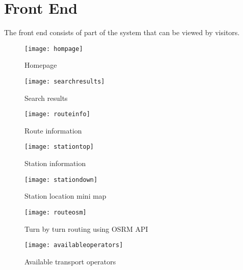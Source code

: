 \section{Front End}
The front end consists of part of the system that can be viewed by visitors.
\begin{figure}[H]
	\centering
	\texttt{[image: hompage]}
	\caption[Homepage]{Homepage}
	\label{fig:hompage}
\end{figure}
\begin{figure}[H]
	\centering
	\texttt{[image: searchresults]}
	\caption[Search Results]{Search results}
	\label{fig:searchresults}
\end{figure}
\begin{figure}[H]
	\centering
	\texttt{[image: routeinfo]}
	\caption[Route Information]{Route information}
	\label{fig:routeinfo}
\end{figure}
\begin{figure}[H]
	\centering
	\texttt{[image: stationtop]}
	\caption[Station information]{Station information}
	\label{fig:stationtop}
\end{figure}
\begin{figure}[H]
	\centering
	\texttt{[image: stationdown]}
	\caption[Station mini map]{Station location mini map}
	\label{fig:stationdown}
\end{figure}
\begin{figure}[H]
	\centering
	\texttt{[image: routeosm]}
	\caption[Turn by turn routing]{Turn by turn routing using OSRM API}
	\label{fig:routeosm}
\end{figure}
\begin{figure}[H]
	\centering
	\texttt{[image: availableoperators]}
	\caption[Avalable operators]{Available transport operators}
	\label{fig:availableoperators}
\end{figure}

